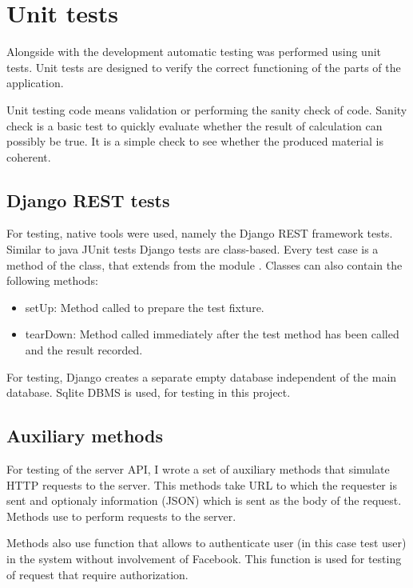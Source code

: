 \section{Unit tests}
Alongside with the development automatic testing was performed using unit tests. Unit tests are designed to verify the
correct functioning of the parts of the application.

Unit testing code means validation or performing the sanity check of code. Sanity check is a basic test to quickly
evaluate whether the result of calculation can possibly be true. It is a simple check to see whether the produced
material is coherent. \cite{unittesting}

\subsection{Django REST tests}
For testing, native tools were used, namely the Django REST framework tests. Similar to java JUnit tests Django tests
are class-based. Every test case is a method of the class, that extends  from the module
. Classes can also contain the following methods:

\begin{itemize}
\item{setUp}: Method called to prepare the test fixture.
\item{tearDown}: Method called immediately after the test method has been called and the result recorded.
\end{itemize}

For testing, Django creates a separate empty database independent of the main database. Sqlite DBMS is used, for testing
in this project.

\subsection{Auxiliary methods}
For testing of the server API, I wrote a set of auxiliary methods that simulate HTTP requests to the server. This
methods take URL to which the requester is sent and optionaly information (JSON) which is sent as the body of the
request. Methods use  to perform requests to the server.

Methods also use  function that allows to authenticate user (in this case test user) in the
system without involvement of Facebook. This function is used for testing of request that require authorization.



